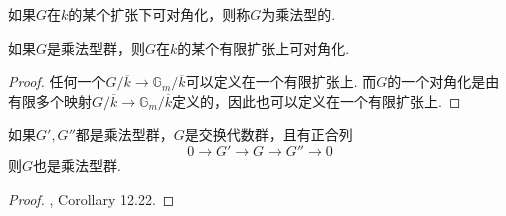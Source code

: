 如果$G$在$k$的某个扩张下可对角化，则称$G$为乘法型的.

\begin{cprop}
    如果$G$是乘法型群，则$G$在$k$的某个有限扩张上可对角化.
\end{cprop}

\begin{proof}
    任何一个$G/\overline{k}\to \mathbb{G}_m/\overline{k}$可以定义在一个有限扩张上. 而$G$的一个对角化是由有限多个映射$G/\overline{k}\to \mathbb{G}_m/\overline{k}$定义的，因此也可以定义在一个有限扩张上.
\end{proof}

\begin{cprop}
    如果$G',G''$都是乘法型群，$G$是交换代数群，且有正合列
    \begin{equation}
        0\to G'\to G\to G''\to 0
    \end{equation}
    则$G$也是乘法型群.
\end{cprop}

\begin{proof}
    \cite{milne2017algebraic}, Corollary 12.22.
\end{proof}
